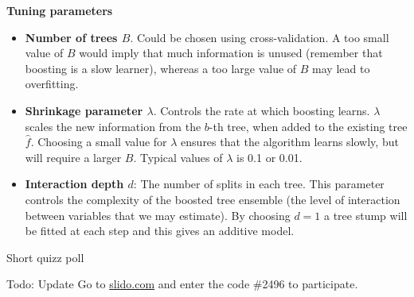 \documentclass[10pt,ignorenonframetext,]{beamer}
\begin{document}
\begin{frame}

\textbf{Tuning parameters}

\begin{itemize}
\item
  \textbf{Number of trees \(B\)}. Could be chosen using
  cross-validation. A too small value of \(B\) would imply that much
  information is unused (remember that boosting is a slow learner),
  whereas a too large value of \(B\) may lead to overfitting.
\item
  \textbf{Shrinkage parameter \(\lambda\)}. Controls the rate at which
  boosting learns. \(\lambda\) scales the new information from the
  \(b\)-th tree, when added to the existing tree \(\hat{f}\). Choosing a
  small value for \(\lambda\) ensures that the algorithm learns slowly,
  but will require a larger \(B\). Typical values of \(\lambda\) is 0.1
  or 0.01.
\item
  \textbf{Interaction depth \(d\)}: The number of splits in each tree.
  This parameter controls the complexity of the boosted tree ensemble
  (the level of interaction between variables that we may estimate). By
  choosing \(d=1\) a tree stump will be fitted at each step and this
  gives an additive model.
\end{itemize}

\end{frame}

\begin{frame}{Short quizz poll}
\protect\hypertarget{short-quizz-poll}{}

Todo: Update Go to \href{http://www.slido.com}{slido.com} and enter the
code \#2496 to participate.

\end{frame}
\end{document}
